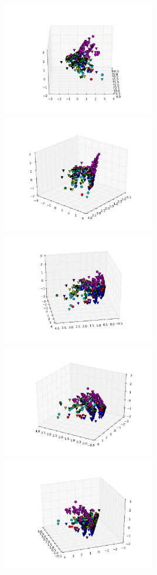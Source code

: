 \includegraphics[width=0.5\textwidth]{img/ej1_sanger_005_20}
\includegraphics[width=0.5\textwidth]{img/ej1_sanger_005_40}
\includegraphics[width=0.5\textwidth]{img/ej1_sanger_005_80}
\includegraphics[width=0.5\textwidth]{img/ej1_sanger_005_120}
\includegraphics[width=0.5\textwidth]{img/ej1_sanger_005_160}
